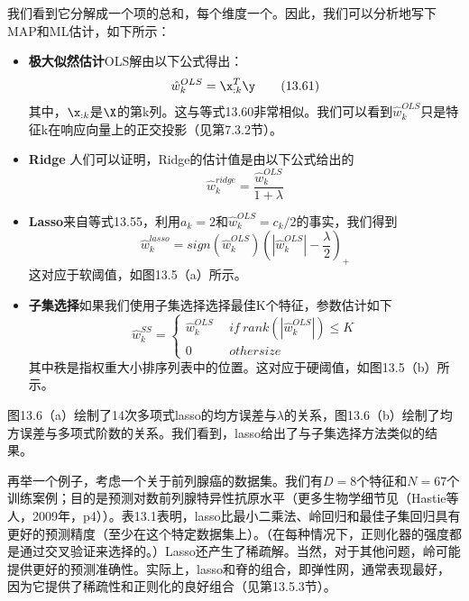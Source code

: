 \documentclass[a4paper]{article}
\begin{document}
我们看到它分解成一个项的总和，每个维度一个。因此，我们可以分析地写下MAP和ML估计，如下所示：
\begin{itemize}
\item \textbf{极大似然估计}OLS解由以下公式得出：
\begin{equation}
	\hat{w}_k^{OLS}=\x_{:k}^T\y\tag{13.61}
\end{equation}
其中，$\x_{:k}$是$\X$的第k列。这与等式13.60非常相似。我们可以看到$\hat{w}_k^{OLS}$只是特征k在响应向量上的正交投影（见第7.3.2节）。
\item \textbf{Ridge} 人们可以证明，Ridge的估计值是由以下公式给出的
\begin{equation}
	\hat{w}_k^{ridge}=\frac{\hat{w}_k^{OLS}}{1+\lambda}\tag{13.62}
\end{equation}
\item \textbf{Lasso}来自等式13.55，利用$a_k=2$和$\hat{w}_k^{OLS}=c_k/2$的事实，我们得到
\begin{equation}
	\hat{w}_k^{lasso}=sign(\hat{w}_k^{OLS})(|\hat{w}_k^{OLS}|-\frac{\lambda}{2})_+\tag{13.63}
\end{equation}
这对应于软阈值，如图13.5（a）所示。
\item \textbf{子集选择}如果我们使用子集选择选择最佳K个特征，参数估计如下
\begin{equation}
	\hat{w}_k^{SS}=\left\{
	\begin{array}{cl}
	\hat{w}_k^{OLS} &\ \ if\ rank(|\hat{w}_k^{OLS}|)\le K\\
	0&\ \ othersize\tag{13.64}
	\end{array}
	\right.
\end{equation}
其中秩是指权重大小排序列表中的位置。这对应于硬阈值，如图13.5（b）所示。
\end{itemize}

图13.6（a）绘制了14次多项式lasso的均方误差与$\lambda$的关系，图13.6（b）绘制了均方误差与多项式阶数的关系。我们看到，lasso给出了与子集选择方法类似的结果。

再举一个例子，考虑一个关于前列腺癌的数据集。我们有$D=8$个特征和$N=67$个训练案例；目的是预测对数前列腺特异性抗原水平（更多生物学细节见（Hastie等人，2009年，p4））。表13.1表明，lasso比最小二乘法、岭回归和最佳子集回归具有更好的预测精度（至少在这个特定数据集上）。（在每种情况下，正则化器的强度都是通过交叉验证来选择的。）Lasso还产生了稀疏解。当然，对于其他问题，岭可能提供更好的预测准确性。实际上，lasso和脊的组合，即弹性网，通常表现最好，因为它提供了稀疏性和正则化的良好组合（见第13.5.3节）。
\end{document}
